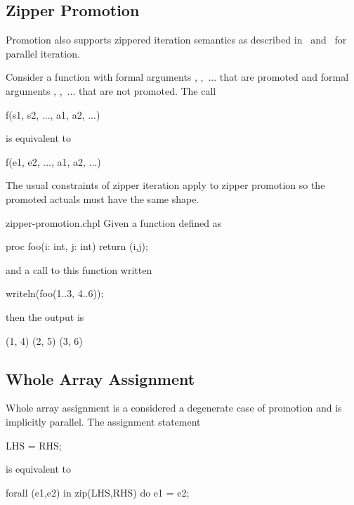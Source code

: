 \subsection{Zipper Promotion}
\label{Zipper_Promotion}

Promotion also supports zippered iteration semantics as described
in~ and~ for parallel
iteration.

Consider a function  with formal
arguments , ,~... that are promoted and formal
arguments , ,~... that are not promoted.  The call
\begin{chapel}
f(s1, s2, ..., a1, a2, ...)
\end{chapel}
is equivalent to
\begin{chapel}
[(e1, e2, ...) in zip(s1, s2, ...)] f(e1, e2, ..., a1, a2, ...)
\end{chapel}
The usual constraints of zipper iteration apply to zipper promotion so
the promoted actuals must have the same shape.

\begin{chapelexample}{zipper-promotion.chpl}
Given a function defined as
\begin{chapel}
proc foo(i: int, j: int) {
  return (i,j);
}
\end{chapel}
and a call to this function written
\begin{chapel}
writeln(foo(1..3, 4..6));
\end{chapel}
then the output is
\begin{chapelprintoutput}{}
(1, 4) (2, 5) (3, 6)
\end{chapelprintoutput}
\end{chapelexample}

\subsection{Whole Array Assignment}
\label{Whole_Array_Assignment}

Whole array assignment is a considered a degenerate case of promotion
and is implicitly parallel.  The assignment statement
\begin{chapel}
LHS = RHS;
\end{chapel}
is equivalent to
\begin{chapel}
forall (e1,e2) in zip(LHS,RHS) do
  e1 = e2;
\end{chapel}

